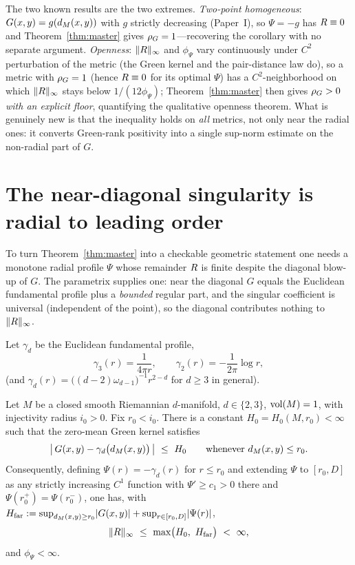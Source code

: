 \begin{remark}
The two known results are the two extremes. \emph{Two-point homogeneous}: $G(x,y)=g(d_M(x,y))$
with $g$ strictly decreasing (Paper~I), so $\Psi=-g$ has $R\equiv0$ and
Theorem~\ref{thm:master} gives $\rho_G=1$---recovering the corollary with no separate
argument. \emph{Openness}: $\lVert R\rVert_\infty$ and $\phi_\Psi$ vary continuously
under $C^2$ perturbation of the metric (the Green kernel and the pair-distance law do),
so a metric with $\rho_G=1$ (hence $R\equiv0$ for its optimal $\Psi$) has a
$C^2$-neighborhood on which $\lVert R\rVert_\infty$ stays below $1/(12\phi_\Psi)$;
Theorem~\ref{thm:master} then gives $\rho_G>0$ \emph{with an explicit floor}, quantifying
the qualitative openness theorem. What is genuinely new is that the inequality holds on
\emph{all} metrics, not only near the radial ones: it converts Green-rank positivity into
a single sup-norm estimate on the non-radial part of $G$.
\end{remark}

\section{The near-diagonal singularity is radial to leading order}

To turn Theorem~\ref{thm:master} into a checkable geometric statement one needs a
monotone radial profile $\Psi$ whose remainder $R$ is finite despite the diagonal
blow-up of $G$. The parametrix supplies one: near the diagonal $G$ equals the Euclidean
fundamental profile plus a \emph{bounded} regular part, and the singular coefficient is
universal (independent of the point), so the diagonal contributes nothing to
$\lVert R\rVert_\infty$.

Let $\gamma_d$ be the Euclidean fundamental profile,
\[
\gamma_3(r)=\frac{1}{4\pi r},\qquad \gamma_2(r)=-\frac{1}{2\pi}\log r,
\]
(and $\gamma_d(r)=\bigl((d-2)\omega_{d-1}\bigr)^{-1}r^{2-d}$ for $d\ge3$ in general).

\begin{lemma}\label{lem:parametrix}
Let $M$ be a closed smooth Riemannian $d$-manifold, $d\in\{2,3\}$, $\operatorname{vol}(M)=1$, with
injectivity radius $i_0>0$. Fix $r_0<i_0$. There is a constant $H_0=H_0(M,r_0)<\infty$
such that the zero-mean Green kernel satisfies
\[
\bigl\lvert\,G(x,y)-\gamma_d\bigl(\dM(x,y)\bigr)\,\bigr\rvert\ \le\ H_0
\qquad\text{whenever }\dM(x,y)\le r_0 .
\]
Consequently, defining $\Psi(r)=-\gamma_d(r)$ for $r\le r_0$ and extending $\Psi$ to
$[r_0,D]$ as any strictly increasing $C^1$ function with $\Psi'\ge c_1>0$ there and
$\Psi(r_0^+)=\Psi(r_0^-)$, one has, with $H_{\mathrm{far}}:=\sup_{d_M(x,y)\ge r_0}\lvert G(x,y)\rvert
+\sup_{r\in[r_0,D]}\lvert\Psi(r)\rvert$,
\[
\lVert\Rem\rVert_\infty\ \le\ \max\bigl(H_0,\ H_{\mathrm{far}}\bigr)\ <\ \infty,
\]
and $\phi_\Psi<\infty$.
\end{lemma}

